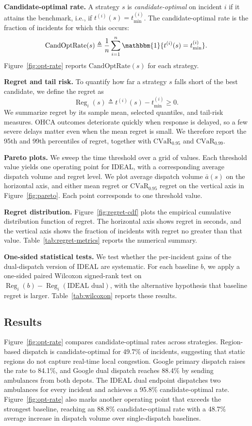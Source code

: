 \documentclass[11pt, letterpaper, oneside, reqno]{amsart}
\newcommand{\Let}{\triangleq}
\begin{document}
\noindent\textbf{Candidate-optimal rate.}
A strategy $s$ is \textit{candidate-optimal} on incident $i$ if it attains the benchmark, i.e., if $t^{(i)}(s)=t^{(i)}_{\min}$. The candidate-optimal rate is the fraction of incidents for which this occurs:
\[
\mathrm{CandOptRate}(s) \Let \frac{1}{n}\sum_{i=1}^n \mathbbm{1}\{t^{(i)}(s)=t^{(i)}_{\min}\}.
\]
Figure~\ref{fig:opt-rate} reports $\mathrm{CandOptRate}(s)$ for each strategy.

\noindent\textbf{Regret and tail risk.}
To quantify how far a strategy $s$ falls short of the best candidate, we define the regret as
\[
\operatorname{Reg}_i(s) \Let t^{(i)}(s)-t^{(i)}_{\min} \ge 0.
\]
We summarize regret by its sample mean, selected quantiles, and tail-risk measures. OHCA outcomes deteriorate quickly when response is delayed, so a few severe delays matter even when the mean regret is small. We therefore report the 95th and 99th percentiles of regret, together with $\mathrm{CVaR}_{0.95}$ and $\mathrm{CVaR}_{0.99}$.

\noindent\textbf{Pareto plots.}
We sweep the time threshold over a grid of values. Each threshold value yields one operating point for IDEAL, with a corresponding average dispatch volume and regret level.
We plot average dispatch volume $\bar a(s)$ on the horizontal axis, and either mean regret or $\mathrm{CVaR}_{0.95}$ regret on the vertical axis in Figure~\ref{fig:pareto}. Each point corresponds to one threshold value.

\noindent\textbf{Regret distribution.}
Figure~\ref{fig:regret-cdf} plots the empirical cumulative distribution function of regret. The horizontal axis shows regret in seconds, and the vertical axis shows the fraction of incidents with regret no greater than that value. Table~\ref{tab:regret-metrics} reports the numerical summary.

\noindent\textbf{One-sided statistical tests.}
We test whether the per-incident gains of the dual-dispatch version of IDEAL are systematic. For each baseline $b$, we apply a one-sided paired Wilcoxon signed-rank test on $\operatorname{Reg}_i(b)-\operatorname{Reg}_i(\text{IDEAL dual})$, with the alternative hypothesis that baseline regret is larger. Table~\ref{tab:wilcoxon} reports these results.


\subsection{Results}\label{sec:experiments:results}

Figure~\ref{fig:opt-rate} compares candidate-optimal rates across strategies. Region-based dispatch is candidate-optimal for 49.7\% of incidents, suggesting that static regions do not capture real-time local congestion. Google primary dispatch raises the rate to 84.1\%, and Google dual dispatch reaches 88.4\% by sending ambulances from both depots. The IDEAL dual endpoint dispatches two ambulances for every incident and achieves a 95.8\% candidate-optimal rate. Figure~\ref{fig:opt-rate} also marks another operating point that exceeds the strongest baseline, reaching an 88.8\% candidate-optimal rate with a 48.7\% average increase in dispatch volume over single-dispatch baselines.
\end{document}
